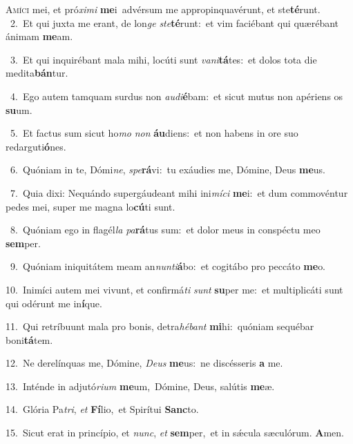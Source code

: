 \lettrine{\initial\textcolor{\initialcolor}{A}}{míci} mei, et pró\-\textit{xi}\-\textit{mi} \textbf{me}\-i~\star advérsum me appropinquavérunt, et ste\-\textbf{té}\-runt.\\
{\numbfont\textcolor{\numbcolor}{~2.}}~Et qui juxta me erant, de lon\textit{ge} \textit{ste}\-\textbf{té}runt:~\star et vim faciébant qui quærébant ánimam \textbf{me}\-am.\par
{\numbfont\textcolor{\numbcolor}{~3.}}~Et qui inquirébant mala mihi, locúti sunt \textit{va}\-\textit{ni}\textbf{tá}tes:~\star et dolos tota die medita\-\textbf{bán}\-tur.\par
{\numbfont\textcolor{\numbcolor}{~4.}}~Ego autem tamquam surdus non \textit{au}\-\textit{di}\textbf{é}bam:~\star et sicut mutus non apériens os \textbf{su}\-um.\par
{\numbfont\textcolor{\numbcolor}{~5.}}~Et factus sum sicut ho\textit{mo} \textit{non} \textbf{áu}\-diens:~\star et non habens in ore suo redarguti\-\textbf{ó}\-nes.\par
{\numbfont\textcolor{\numbcolor}{~6.}}~Quóniam in te, Dómi\-\textit{ne}\-, \textit{spe}\-\textbf{rá}vi:~\star tu exáudies me, Dómine, Deus \textbf{me}\-us.\par
{\numbfont\textcolor{\numbcolor}{~7.}}~Quia dixi: Nequándo supergáudeant mihi ini\-\textit{mí}\-\textit{ci} \textbf{me}\-i:~\star et dum commovéntur pedes mei, super me magna lo\-\textbf{cú}\-ti sunt.\par
{\numbfont\textcolor{\numbcolor}{~8.}}~Quóniam ego in flagél\textit{la} \textit{pa}\-\textbf{rá}tus sum:~\star et dolor meus in conspéctu meo \textbf{sem}\-per.\par
{\numbfont\textcolor{\numbcolor}{~9.}}~Quóniam iniquitátem meam an\-\textit{nun}\-\textit{ti}\textbf{á}bo:~\star et cogitábo pro peccáto \textbf{me}\-o.\par
{\numbfont\textcolor{\numbcolor}{10.}}~Inimíci autem mei vivunt, et confirmá\textit{ti} \textit{sunt} \textbf{su}\-per me:~\star et multiplicáti sunt qui odérunt me in\-\textbf{í}\-que.\par
{\numbfont\textcolor{\numbcolor}{11.}}~Qui retríbuunt mala pro bonis, detra\-\textit{hé}\-\textit{bant} \textbf{mi}\-hi:~\star quóniam sequébar boni\-\textbf{tá}\-tem.\par
{\numbfont\textcolor{\numbcolor}{12.}}~Ne derelínquas me, Dómine, \textit{De}\-\textit{us} \textbf{me}\-us:~\star ne discésseris \textbf{a} me.\par
{\numbfont\textcolor{\numbcolor}{13.}}~Inténde in adjutó\-\textit{ri}\-\textit{um} \textbf{me}\-um,~\star Dómine, Deus, salútis \textbf{me}\-æ.\par
{\numbfont\textcolor{\numbcolor}{14.}}~Glória Pa\-\textit{tri}\-, \textit{et} \textbf{Fí}\-lio,~\star et Spirítui \textbf{Sanc}\-to.\par
{\numbfont\textcolor{\numbcolor}{15.}}~Sicut erat in princípio, et \textit{nunc}\-, \textit{et} \textbf{sem}\-per,~\star et in sǽcula sæculórum. \textbf{A}\-men.\par

